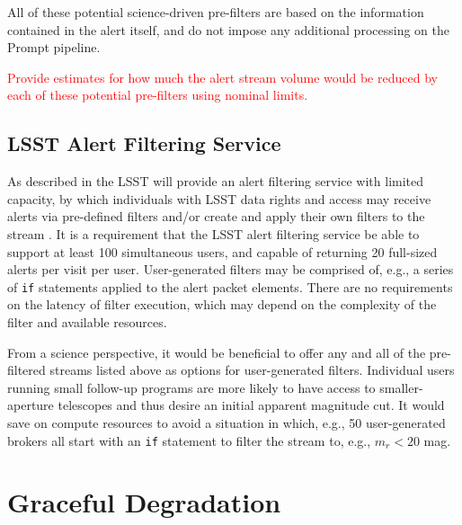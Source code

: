 \documentclass[DM,lsstdraft,authoryear,toc]{lsstdoc}
\begin{document}
All of these potential science-driven pre-filters are based on the information contained in the alert itself, and do not impose any additional processing on the Prompt pipeline.
 
\textcolor{red}{Provide estimates for how much the alert stream volume would be reduced by each of these potential pre-filters using nominal limits.}


\subsection{LSST Alert Filtering Service}\label{ssec:prefilter_lafs}

As described in  the LSST will provide an alert filtering service with limited capacity, by which individuals with LSST data rights and access may receive alerts via pre-defined filters and/or create and apply their own filters to the stream .
It is a requirement that the LSST alert filtering service be able to support at least 100 simultaneous users, and capable of returning 20 full-sized alerts per visit per user.
User-generated filters may be comprised of, e.g., a series of {\tt if} statements applied to the alert packet elements.
There are no requirements on the latency of filter execution, which may depend on the complexity of the filter and available resources. 

From a science perspective, it would be beneficial to offer any and all of the pre-filtered streams listed above as options for user-generated filters.
Individual users running small follow-up programs are more likely to have access to smaller-aperture telescopes and thus desire an initial apparent magnitude cut.
It would save on compute resources to avoid a situation in which, e.g., 50 user-generated brokers all start with an {\tt if} statement to filter the stream to, e.g., $m_r < 20$ mag. 






\clearpage
\section{Graceful Degradation} \label{sec:graceful}
\end{document}
